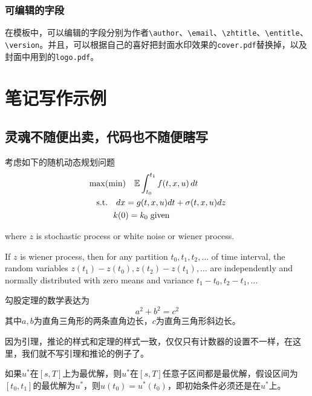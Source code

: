 \documentclass[cyan]{elegantnote}
\begin{document}
\subsection{可编辑的字段}
在模板中，可以编辑的字段分别为作者\verb|\author|、\verb|\email|、\verb|\zhtitle|、\verb|\entitle|、\verb|\version|。并且，可以根据自己的喜好把封面水印效果的\verb|cover.pdf|替换掉，以及封面中用到的\verb|logo.pdf|。

\chapter{笔记写作示例}

\section{灵魂不随便出卖，代码也不随便瞎写}
\lipsum[3]
考虑如下的随机动态规划问题
\begin{align*}
&\max(\min)\quad \mathbb{E}\int_{t_0}^{t_1}f(t,x,u)\,dt\\
&\quad\mbox{s.t.} \quad dx=g(t,x,u)dt+\sigma(t,x,u)dz\\
&\quad \hspace{2.em} k(0)=k_0\;\text{given}
\end{align*}

where $z$ is stochastic process or white noise or wiener process.
%
\begin{newdef}
If $z$ is wiener process, then for any partition $t_0,t_1,t_2,\ldots$ of time interval, the random variables $z(t_1)-z(t_0),z(t_2)-z(t_1),\ldots$ are independently and normally distributed with zero means and variance $t_1-t_0,t_2-t_1,\ldots$
\end{newdef}

\lipsum[1-2]

\begin{newthem}[勾股定理]
勾股定理的数学表达为
\[a^2+b^2=c^2\]
其中$a,b$为直角三角形的两条直角边长，$c$为直角三角形斜边长。
\end{newthem}

\begin{note}
因为引理，推论的样式和定理的样式一致，仅仅只有计数器的设置不一样，在这里，我们就不写引理和推论的例子了。
\end{note}


\lipsum[4]

\begin{newprop}[最优性原理]
如果$u^*$在$[s,T]$上为最优解，则$u^*$在$[s,T]$任意子区间都是最优解，假设区间为$[t_0,t_1]$的最优解为$u^*$，则$u(t_0)=u^{*}(t_0)$，即初始条件必须还是在$u^*$上。
\end{newprop}
\end{document}
